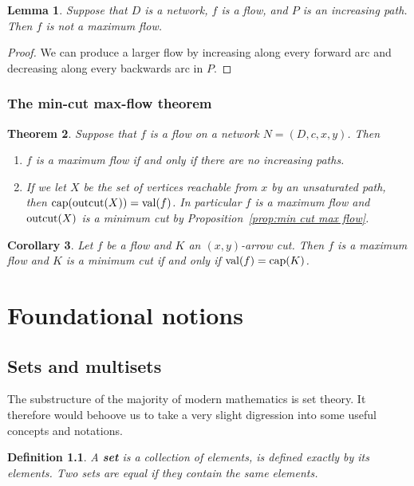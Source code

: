 \documentclass[12pt]{report}
\theoremstyle{plain}
\newtheorem{thm}{Theorem}[section]
\newtheorem{defn}[thm]{Definition}
\newtheorem{lem}[thm]{Lemma}
\newtheorem{cor}[thm]{Corollary}
\newcommand{\Xb}[1]{\textbf{#1}\index{#1}}
\begin{document}
\begin{lem}
Suppose that $D$ is a network, $f$ is a flow, and $P$ is an increasing
path. Then $f$ is not a maximum flow.
\end{lem}
\begin{proof}
We can produce a larger flow by increasing along every forward arc and
decreasing along every backwards arc in $P$.
\end{proof}

\subsection{The min-cut max-flow theorem}

\begin{thm}
Suppose that $f$ is a flow on a network $N = (D, c, x, y)$. Then
\begin{enumerate}[ 1. ]
\item
  $f$ is a maximum flow if and only if there are no increasing paths.
\item
  If we let $X$ be the set of vertices reachable from $x$ by an unsaturated
  path, then $\operatorname{cap}(\operatorname{outcut}(X)) = \operatorname{val}(f)$. In particular $f$ is a
  maximum flow and $\operatorname{outcut}(X)$ is a minimum cut by Proposition~\ref{prop:min
  cut max flow}.
\end{enumerate}
\end{thm}

\begin{cor}
Let $f$ be a flow and $K$ an $(x,y)$-arrow cut. Then $f$ is a maximum flow
and $K$ is a minimum cut if and only if $\operatorname{val}(f) = \operatorname{cap}(K)$.
\end{cor}

\appendix

\chapter{Foundational notions}

\section{Sets and multisets}

The substructure of the majority of modern mathematics is set theory. It
therefore would behoove us to take a very slight digression into some
useful concepts and notations.

\begin{defn}
A \Xb{set} is a collection of elements, is defined exactly by its elements.
Two sets are equal if they contain the same elements.
\end{defn}
\end{document}
